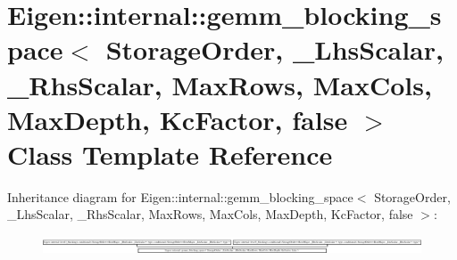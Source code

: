 \hypertarget{class_eigen_1_1internal_1_1gemm__blocking__space_3_01_storage_order_00_01___lhs_scalar_00_01___rbcde58016e0f2e47700c92659db0c8a7}{}\section{Eigen\+:\+:internal\+:\+:gemm\+\_\+blocking\+\_\+space$<$ Storage\+Order, \+\_\+\+Lhs\+Scalar, \+\_\+\+Rhs\+Scalar, Max\+Rows, Max\+Cols, Max\+Depth, Kc\+Factor, false $>$ Class Template Reference}
\label{class_eigen_1_1internal_1_1gemm__blocking__space_3_01_storage_order_00_01___lhs_scalar_00_01___rbcde58016e0f2e47700c92659db0c8a7}
Inheritance diagram for Eigen\+:\+:internal\+:\+:gemm\+\_\+blocking\+\_\+space$<$ Storage\+Order, \+\_\+\+Lhs\+Scalar, \+\_\+\+Rhs\+Scalar, Max\+Rows, Max\+Cols, Max\+Depth, Kc\+Factor, false $>$\+:\begin{figure}[H]
\begin{center}
\leavevmode
\includegraphics[height=0.533842cm]{class_eigen_1_1internal_1_1gemm__blocking__space_3_01_storage_order_00_01___lhs_scalar_00_01___rbcde58016e0f2e47700c92659db0c8a7}
\end{center}
\end{figure}
